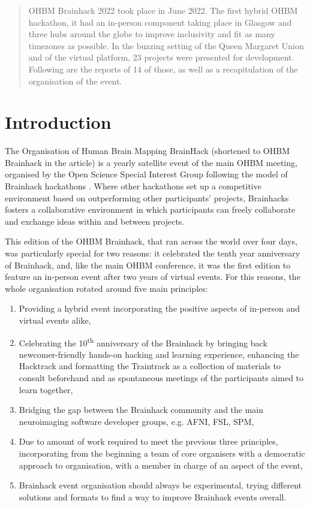 \documentclass[10pt,a4paper,twocolumns]{proc}
\let\Oldsection\section
\renewcommand{\section}{\FloatBarrier\Oldsection}
\begin{document}
\begin{abstract}
OHBM Brainhack 2022 took place in June 2022. The first hybrid OHBM hackathon, it had an in-person component taking place in Glasgow and three hubs around the globe to improve inclusivity and fit as many timezones as possible.
In the buzzing setting of the Queen Margaret Union and of the virtual platform, 23 projects were presented for development.
Following are the reports of 14 of those, as well as a recapitulation of the organisation of the event. 
\end{abstract}

\section*{Introduction}

The Organisation of Human Brain Mapping BrainHack (shortened to OHBM
Brainhack in the article) is a yearly satellite event of the main OHBM
meeting, organised by the Open Science Special Interest Group following
the model of Brainhack hackathons \parencite{Gau2021}.
Where other hackathons set up a competitive environment based on
outperforming other participants' projects, Brainhacks fosters a
collaborative environment in which participants can freely collaborate
and exchange ideas within and between projects.

This edition of the OHBM Brainhack, that ran across the world over four
days, was particularly special for two reasons: it celebrated the tenth
year anniversary of Brainhack, and, like the main OHBM conference, it
was the first edition to feature an in-person event after two years of
virtual events. For this reasons, the whole organisation rotated around
five main principles:

\begin{enumerate}
\tightlist
\item
  Providing a hybrid event incorporating the positive aspects of
  in-person and virtual events alike,
\item
  Celebrating the 10\textsuperscript{th} anniversary of the
  Brainhack by bringing back newcomer-friendly hands-on hacking and
  learning experience, enhancing the Hacktrack and formatting the
  Traintrack as a collection of materials to consult beforehand and as
  spontaneous meetings of the participants aimed to learn together,
\item
  Bridging the gap between the Brainhack community and the main
  neuroimaging software developer groups, e.g. AFNI, FSL, SPM,
\item
  Due to amount of work required to meet the previous three principles,
  incorporating from the beginning a team of core organisers with a
  democratic approach to organisation, with a member in charge of an
  aspect of the event,
\item
  Brainhack event organisation should always be experimental, trying
  different solutions and formats to find a way to improve Brainhack
  events overall. 
\end{enumerate}
\end{document}

